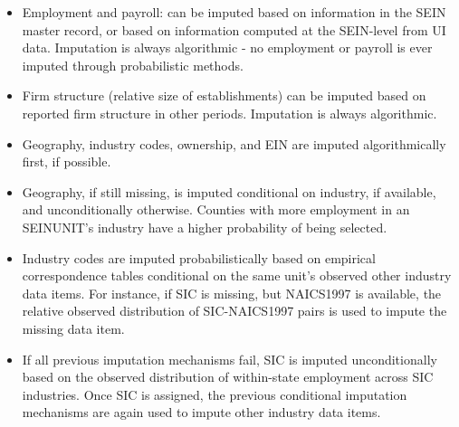 \begin{itemize}
\item Employment and payroll: can be imputed based on information in the
  SEIN master record, or based on information computed at the SEIN-level from UI
  data. Imputation is always algorithmic - no employment or payroll is ever
  imputed through probabilistic methods. 
\item Firm structure (relative size of establishments) can be imputed based
  on reported firm structure in other periods. Imputation is always algorithmic.
\item Geography, industry codes, ownership, and EIN are imputed
  algorithmically first, if possible.
\item Geography, if still missing, is imputed conditional on industry, if
  available, and unconditionally otherwise. Counties with more employment
  in an SEINUNIT's industry have a higher probability of being selected.
\item Industry codes are imputed probabilistically based on empirical
  correspondence tables conditional on the same unit's observed other
  industry data items. For instance, if SIC is missing, but NAICS1997 is
  available, the relative observed distribution of SIC-NAICS1997 pairs is
  used to impute the missing data item.
\item If all previous imputation mechanisms fail, SIC is imputed
  unconditionally based on the observed distribution of within-state
  employment across SIC industries. Once SIC is assigned, the previous
  conditional imputation mechanisms are again used to impute other industry
  data items.
\end{itemize}


